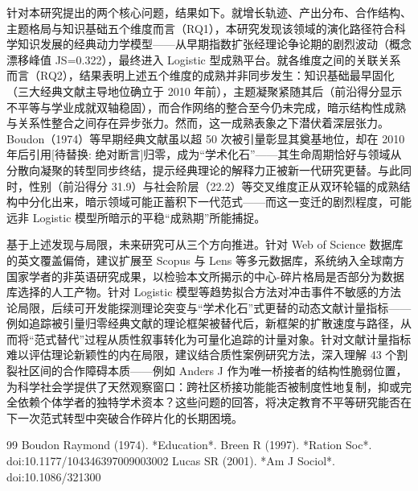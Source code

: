 \documentclass[12pt,a4paper]{article}
\begin{document}
针对本研究提出的两个核心问题，结果如下。就增长轨迹、产出分布、合作结构、主题格局与知识基础五个维度而言（RQ1），本研究发现该领域的演化路径符合科学知识发展的经典动力学模型——从早期指数扩张经理论争论期的剧烈波动（概念漂移峰值 JS=0.322），最终进入 Logistic 型成熟平台。就各维度之间的关联关系而言（RQ2），结果表明上述五个维度的成熟并非同步发生：知识基础最早固化（三大经典文献主导地位确立于 2010 年前），主题凝聚紧随其后（前沿得分显示不平等与学业成就双轴稳固），而合作网络的整合至今仍未完成，暗示结构性成熟与关系性整合之间存在异步张力。然而，这一成熟表象之下潜伏着深层张力。Boudon（1974）等早期经典文献虽以超 50 次被引量彰显其奠基地位，却在 2010 年后引用[待替换: 绝对断言]归零，成为“学术化石”——其生命周期恰好与领域从分散向凝聚的转型同步终结，提示经典理论的解释力正被新一代研究更替。与此同时，性别（前沿得分 31.9）与社会阶层（22.2）等交叉维度正从双环轮辐的成熟结构中分化出来，暗示领域可能正蓄积下一代范式——而这一变迁的剧烈程度，可能远非 Logistic 模型所暗示的平稳“成熟期”所能捕捉。

基于上述发现与局限，未来研究可从三个方向推进。针对 Web of Science 数据库的英文覆盖偏倚，建议扩展至 Scopus 与 Lens 等多元数据库，系统纳入全球南方国家学者的非英语研究成果，以检验本文所揭示的中心-碎片格局是否部分为数据库选择的人工产物。针对 Logistic 模型等趋势拟合方法对冲击事件不敏感的方法论局限，后续可开发能探测理论突变与“学术化石”式更替的动态文献计量指标——例如追踪被引量归零经典文献的理论框架被替代后，新框架的扩散速度与路径，从而将“范式替代”过程从质性叙事转化为可量化追踪的计量对象。针对文献计量指标难以评估理论新颖性的内在局限，建议结合质性案例研究方法，深入理解 43 个割裂社区间的合作障碍本质——例如 Anders J 作为唯一桥接者的结构性脆弱位置，为科学社会学提供了天然观察窗口：跨社区桥接功能能否被制度性地复制，抑或完全依赖个体学者的独特学术资本？这些问题的回答，将决定教育不平等研究能否在下一次范式转型中突破合作碎片化的长期困境。

\begin{thebibliography}{99}
 Boudon Raymond (1974).  *Education*.
 Breen R (1997).  *Ration Soc*.  doi:10.1177/104346397009003002
 Lucas SR (2001).  *Am J Sociol*.  doi:10.1086/321300
\end{thebibliography}
\end{document}
